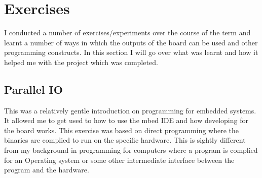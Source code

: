 \documentclass[a4paper,12pt]{scrartcl}
\begin{document}
	\section{Exercises}
	{
		I conducted a number of exercises/experiments over the course of the term and learnt a number of ways in which the outputs of the board can be used and other programming constructs. In this section I will go over what was learnt and how it helped me with the project which was completed.
		\subsection{Parallel IO}
		{
			This was a relatively gentle introduction on programming for embedded systems. It allowed me to get used to how to use the mbed IDE and how developing for the board works. This exercise was based on direct programming where the binaries are complied to run on the specific hardware. This is sightly different from my background in programming for computers where a program is complied for an Operating system or some other intermediate interface between the program and the hardware. 
		}
}
\end{document}
